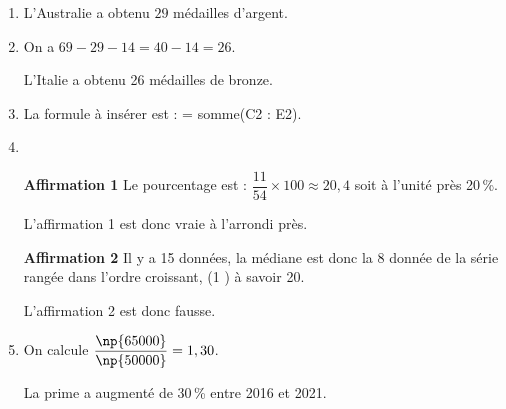 
\medskip

\begin{enumerate}
\item L'Australie a obtenu $29$ médailles d'argent.
\item On a $69 - 29 - 14 = 40 - 14 = 26$.

L'Italie a obtenu 26 médailles de bronze.
\item La formule à insérer est : = somme(C2 : E2).

\item ~

\textbf{Affirmation 1} Le pourcentage est : $\dfrac{11}{54} \times 100 \approx 20,4$ soit à l'unité près 20\,\%.

L'affirmation 1 est donc vraie à l'arrondi près.

\medskip

\textbf{Affirmation 2} Il y a 15 données, la médiane est donc la 8 donnée de la série rangée dans l'ordre croissant, (1       ) à savoir 20.

L'affirmation 2 est donc fausse.
\item  On calcule $\dfrac{\np{65000}}{\np{50000}} = 1,30$.

La prime a augmenté de 30\,\% entre 2016 et 2021.

\end{enumerate}

\bigskip 

